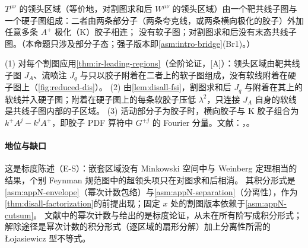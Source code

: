 \begin{proposition}\label{prop:disall-regions}
$T^{\mu\nu}$ 的领头区域（等价地，对割图求和后 $W^{\mu\nu}$ 的领头区域）由一个靶共线子图与一个硬子图组成：二者由两条部分子（两条夸克线，或两条横向极化的胶子）外加任意多条 $A^+$ 极化（K）胶子相连；
没有软子图；对割图求和后没有末态共线子图。（本命题只涉及部分子态；强子版本即\cref{asm:intro-bridge}(Br1)。）
\end{proposition}

\begin{proofsketch}
(1) 对每个割图应用\cref{thm:ir-leading-regions}（全阶论证，[A]）：领头区域由靶共线子图 $J_A$、流喷注 $J_q$ 与只以胶子附着在二者上的软子图组成，没有软线附着在硬子图上（\cref{fig:reduced-dis}）。
(2) 由\cref{lem:disall-fsi}，割图求和后 $J_q$ 与附着在其上的软线并入硬子图；附着在硬子图上的每条软胶子压低 $\lambda^2$，只连接 $J_A$ 自身的软线是共线子图内部的子区域。
(3) 活动部分子为胶子时，横向胶子与 K 胶子组合为 $k^+A^j-k^jA^+$，即胶子 PDF 算符中 $G^{+j}$ 的 Fourier 分量。文献：\cite{LibbySterman1978a}，\cite[第~8.7~节]{CollinsSoperSterman1989}。
\end{proofsketch}

\paragraph{地位与缺口}
这是标度陈述（E-S）：嵌套区域没有 Minkowski 空间中与 Weinberg 定理相当的结果，个别 Feynman 规范图中的超领头项只在对图求和后相消。
其积分形式是\cref{asm:appN-envelope}（幂次计数包络）与\cref{asm:appN-separation}（分离性），作为\cref{thm:disall-factorization}的前提出现；固定 $x$ 处的割图版本依赖于\cref{asm:appN-cutsum}。
文献中的幂次计数\cite{LibbySterman1978a}与\cite[第~5~章]{Collins2011}给出的是标度论证，从未在所有阶写成积分形式；解除途径是幂次计数的积分形式（逐区域的扇形分解）加上分离性所需的 Łojasiewicz 型不等式。
